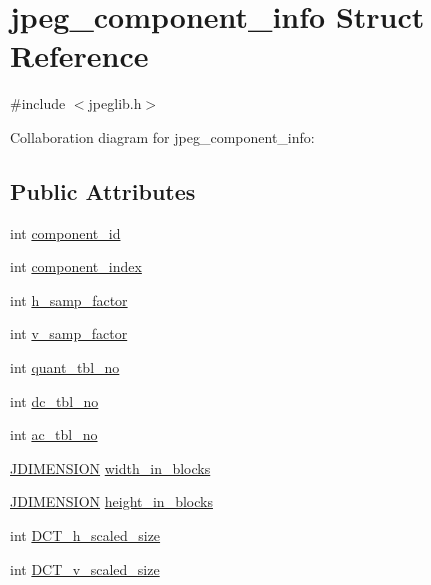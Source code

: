 \hypertarget{structjpeg__component__info}{}\section{jpeg\+\_\+component\+\_\+info Struct Reference}
\label{structjpeg__component__info}


{\ttfamily \#include $<$jpeglib.\+h$>$}



Collaboration diagram for jpeg\+\_\+component\+\_\+info\+:
\subsection*{Public Attributes}
\begin{DoxyCompactItemize}
\item 
int \hyperlink{structjpeg__component__info_a205782ff7ec47c58cb470f121247ea8d}{component\+\_\+id}
\item 
int \hyperlink{structjpeg__component__info_aa29b9e1c664a9b0b8a1c3069ad167817}{component\+\_\+index}
\item 
int \hyperlink{structjpeg__component__info_a3a8e122fa2eee3c7bede586d371fe202}{h\+\_\+samp\+\_\+factor}
\item 
int \hyperlink{structjpeg__component__info_a83b263da2a749a8fe96be728889af0df}{v\+\_\+samp\+\_\+factor}
\item 
int \hyperlink{structjpeg__component__info_a0a9d70b6a95d3ca58a34a7ea8bfefbf8}{quant\+\_\+tbl\+\_\+no}
\item 
int \hyperlink{structjpeg__component__info_a304fa583caa0601abc7077a218988854}{dc\+\_\+tbl\+\_\+no}
\item 
int \hyperlink{structjpeg__component__info_adfea67573a39b232c3d82ac808539a83}{ac\+\_\+tbl\+\_\+no}
\item 
\hyperlink{jmorecfg_8h_a04ed4674f6f1d0d50ec241531e38274f}{J\+D\+I\+M\+E\+N\+S\+I\+O\+N} \hyperlink{structjpeg__component__info_a059454e8192effeabc6eab34e2ad198d}{width\+\_\+in\+\_\+blocks}
\item 
\hyperlink{jmorecfg_8h_a04ed4674f6f1d0d50ec241531e38274f}{J\+D\+I\+M\+E\+N\+S\+I\+O\+N} \hyperlink{structjpeg__component__info_a3f9218e7590c328bfd88d900f58886f4}{height\+\_\+in\+\_\+blocks}
\item 
int \hyperlink{structjpeg__component__info_a54dc0e1df56d88d3257fef0abfd9fea0}{D\+C\+T\+\_\+h\+\_\+scaled\+\_\+size}
\item 
int \hyperlink{structjpeg__component__info_a8099359745c7887abe9158cf5655b5f3}{D\+C\+T\+\_\+v\+\_\+scaled\+\_\+size}

\end{DoxyCompactItemize}
